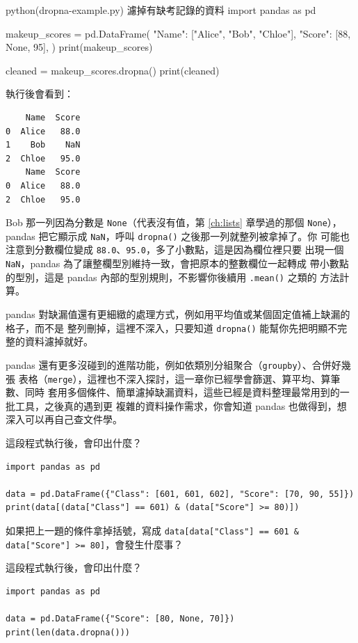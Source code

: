 \begin{example}{python}{(dropna-example.py) 濾掉有缺考記錄的資料}
import pandas as pd

makeup_scores = pd.DataFrame({
    "Name": ["Alice", "Bob", "Chloe"],
    "Score": [88, None, 95],
})
print(makeup_scores)

cleaned = makeup_scores.dropna()
print(cleaned)
\end{example}

執行後會看到：

\begin{verbatim}
    Name  Score
0  Alice   88.0
1    Bob    NaN
2  Chloe   95.0
    Name  Score
0  Alice   88.0
2  Chloe   95.0
\end{verbatim}

Bob 那一列因為分數是 \texttt{None}（代表沒有值，第 \ref{ch:lists} 章學過的那個 \texttt{None}），
pandas 把它顯示成 \texttt{NaN}，呼叫 \texttt{dropna()} 之後那一列就整列被拿掉了。你
可能也注意到分數欄位變成 \texttt{88.0}、\texttt{95.0}，多了小數點，這是因為欄位裡只要
出現一個 \texttt{NaN}，pandas 為了讓整欄型別維持一致，會把原本的整數欄位一起轉成
帶小數點的型別，這是 pandas 內部的型別規則，不影響你後續用 \texttt{.mean()} 之類的
方法計算。

pandas 對缺漏值還有更細緻的處理方式，例如用平均值或某個固定值補上缺漏的格子，而不是
整列刪掉，這裡不深入，只要知道 \texttt{dropna()} 能幫你先把明顯不完整的資料濾掉就好。

pandas 還有更多沒碰到的進階功能，例如依類別分組聚合（\texttt{groupby}）、合併好幾張
表格（\texttt{merge}），這裡也不深入探討，這一章你已經學會篩選、算平均、算筆數、同時
套用多個條件、簡單濾掉缺漏資料，這些已經是資料整理最常用到的一批工具，之後真的遇到更
複雜的資料操作需求，你會知道 pandas 也做得到，想深入可以再自己查文件學。

\begin{drills}[label=drills:pandas-multi-filter]
\item 這段程式執行後，會印出什麼？
\begin{verbatim}
import pandas as pd

data = pd.DataFrame({"Class": [601, 601, 602], "Score": [70, 90, 55]})
print(data[(data["Class"] == 601) & (data["Score"] >= 80)])
\end{verbatim}
\item 如果把上一題的條件拿掉括號，寫成
\texttt{data[data["Class"] == 601 \& data["Score"] >= 80]}，會發生什麼事？
\item 這段程式執行後，會印出什麼？
\begin{verbatim}
import pandas as pd

data = pd.DataFrame({"Score": [80, None, 70]})
print(len(data.dropna()))
\end{verbatim}
\end{drills}

